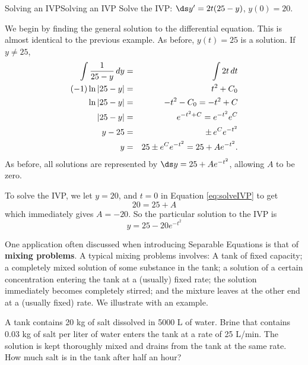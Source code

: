 \begin{example}{Solving an IVP}{Solving an IVP}\label{Solving an IVP}
 Solve the IVP: $\ds y' = 2t(25-y)$, $ y(0)= 20 $.
\end{example}
 
\begin{solution}
We begin by finding the general solution to the differential equation. 
This is almost identical to the previous example. As before, $y(t)=25$
is a solution. If $y\not=25$,
\begin{eqnarray}
\int {1\over 25-y}\,dy &=& \int 2t\,dt\cr
(-1)\ln|25-y| &=& t^2+C_0\cr
\ln|25-y| &=& -t^2 - C_0 = -t^2 + C\cr
|25-y| &=& e^{-t^2+C}=e^{-t^2} e^C\cr
y-25 &=& \pm\, e^C e^{-t^2} \cr
y &=& 25 \pm e^C e^{-t^2} =25+Ae^{-t^2}. \label{eqn:solveIVP}
\end{eqnarray}
As before, all solutions are represented by $\ds y=25+Ae^{-t^2}$,
allowing $A$ to be zero.

To solve the IVP, we let $ y= 20$, and $ t=0 $ in Equation \ref{eq:solveIVP} to get
$$
20=25+A
$$
which immediately gives $ A=-20 $. So the particular solution to the IVP is
\[
y=25-20e^{-t^2}
\]
\end{solution}


One application often discussed when introducing Separable Equations is that of \textbf{mixing problems}.
A typical mixing problems involves: A tank of fixed capacity; a completely mixed solution of some substance in the tank; a solution of a certain concentration entering the tank at a (usually) fixed rate; the solution immediately becomes completely stirred; and the mixture leaves at the other end at a (usually fixed) rate. We illustrate with an example.

\begin{example}
A tank contains 20 kg of salt dissolved in 5000 L of water.  Brine that contains 0.03 kg of salt per liter of water enters the tank at a rate of 25 L/min.  The solution is kept thoroughly mixed and drains from the tank at the same rate. {How much salt is in the tank after half an hour?}
\end{example}



